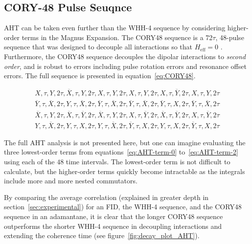 \subsection{CORY-48 Pulse Seuqnce}\label{subsec:CORY48}

AHT can be taken even further than the WHH-4 sequence by considering higher-order terms in the Magnus Expansion. The CORY48 sequence is a 72$\tau$, 48-pulse sequence that was designed to decouple all interactions so that $H_{\text{eff}} = 0$ \cite{CORY1990205}. Furthermore, the CORY48 sequence decouples the dipolar interactions to \emph{second order}, and is robust to errors including pulse rotation errors and resonance offset errors. The full sequence is presented in equation~\ref{eq:CORY48}.

\begin{equation}\label{eq:CORY48}
\begin{aligned}
    X, \tau, Y, 2\tau, \overline{X}, \tau, Y, 2\tau, X, \tau, Y, 2\tau,
    X, \tau, Y, 2\tau, X, \tau, \overline{Y}, 2\tau, X, \tau, Y, 2\tau \\
    \overline{Y}, \tau, \overline{X}, 2\tau, Y, \tau, \overline{X}, 2\tau,
    \overline{Y}, \tau, \overline{X}, 2\tau, \overline{Y}, \tau, \overline{X},
    2\tau, \overline{Y}, \tau, X, 2\tau, \overline{Y}, \tau, \overline{X},
    2\tau \\
    \overline{X}, \tau, Y, 2\tau, \overline{X}, \tau, \overline{Y}, 2\tau,
    \overline{X}, \tau, Y, 2\tau, X, \tau, \overline{Y}, 2\tau, \overline{X},
    \tau, \overline{Y}, 2\tau, X, \tau, \overline{Y}, 2\tau \\
    Y, \tau, \overline{X}, 2\tau, Y, \tau, X, 2\tau, Y, \tau, \overline{X}, 2\tau, \overline{Y}, \tau, X, 2\tau, Y, \tau, X, 2\tau, \overline{Y}, \tau, X, 2\tau
\end{aligned}
\end{equation}


The full AHT analysis is not presented here, but one can imagine evaluating the three lowest-order terms from equations~\ref{eq:AHT-term-0} to~\ref{eq:AHT-term-2} using each of the $48$ time intervals. The lowest-order term is not difficult to calculate, but the higher-order terms quickly become intractable as the integrals include more and more nested commutators.

By comparing the average correlation (explained in greater depth in section~\ref{sec:experimental}) for an FID, the WHH-4 sequence, and the CORY48 sequence in an adamantane, it is clear that the longer CORY48 sequence outperforms the shorter WHH-4 sequence in decoupling interactions and extending the coherence time (see figure~\ref{fig:decay_plot_AHT}).



